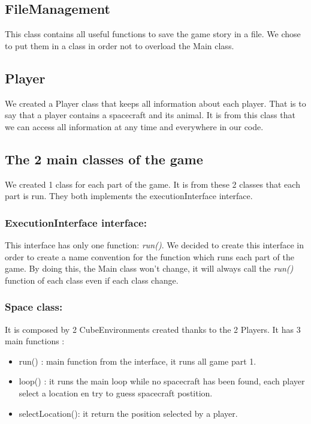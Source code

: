 \subsection{FileManagement}

This class contains all useful functions to save the game story in a file. 
We chose to put them in a class in order not to overload the Main class.

\subsection{Player}

We created a Player class that keeps all information about each player. 
That is to say that a player contains a spacecraft and its animal.
It is from this class that we can access all information at any time and everywhere in our code.

\subsection{The 2 main classes of the game}

We created 1 class for each part of the game. 
It is from these 2 classes that each part is run.
They both implements the executionInterface interface.

\subsubsection{ExecutionInterface interface:}

This interface has only one function: \textit{run()}. 
We decided to create this interface in order to create a name convention for the function which runs each part of the game.
By doing this, the Main class won't change, it will always call the \textit{run()} function of each class even if each class change.

\subsubsection{Space class:}

It is composed by 2 CubeEnvironments created thanks to the 2 Players.
It has 3 main functions : 
\begin{itemize}
 \item run() : main function from the interface, it runs all game part 1.
 \item loop() : it runs the main loop while no spacecraft has been found, each player select a location en try to guess spacecraft postition.
 \item selectLocation(): it return the position selected by a player.
\end{itemize}

